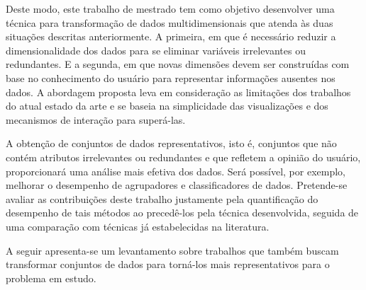 Deste modo, este trabalho de mestrado tem como objetivo
desenvolver uma técnica para transformação de dados
multidimensionais que atenda às duas situações descritas
anteriormente. A primeira, em que é necessário reduzir a
dimensionalidade dos dados para se eliminar variáveis
irrelevantes ou redundantes. E a segunda, em que novas
dimensões devem ser construídas com base no conhecimento do
usuário para representar informações ausentes nos dados. A
abordagem proposta leva em consideração as limitações dos
trabalhos do atual estado da arte e se baseia na
simplicidade das visualizações e dos mecanismos de interação
para superá-las. 

A obtenção de conjuntos de dados representativos, isto é,
conjuntos que não contém atributos irrelevantes ou
redundantes e que refletem a opinião do usuário,
proporcionará uma análise mais efetiva dos dados. Será
possível, por exemplo, melhorar o desempenho de agrupadores
e classificadores de dados. Pretende-se avaliar as
contribuições deste trabalho justamente pela quantificação
do desempenho de tais métodos ao precedê-los pela técnica
desenvolvida, seguida de uma comparação com técnicas já
estabelecidas na literatura.

A seguir apresenta-se um levantamento sobre trabalhos
que também buscam transformar conjuntos de dados para
torná-los mais representativos para o problema em estudo. 
